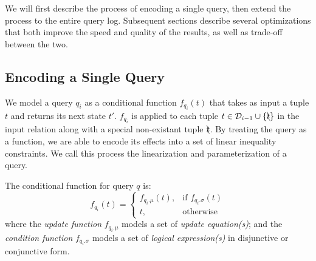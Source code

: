 We will first describe the process of encoding a single query,
then extend the process to the entire query log.
Subsequent sections describe several optimizations that  both
improve the speed and quality of the results, as well as trade-off between the two. 




\subsection{Encoding a Single Query}%
\label{sec:linearize}

We model a query $q_i$ as a conditional function $f_{q_i}(t)$ that takes as input a tuple $t$
and returns its next state $t'$.  $f_{q_i}$ is applied to each 
tuple $t \in \mathcal{D}_{i-1} \cup \{\bcancel{t}\}$ in the input relation along with a special
non-existant tuple $\bcancel{t}$. 
By treating the query as a function, we are able to encode its effects into a set
of linear inequality constraints.  We call this process the linearization and 
parameterization of a query.

\begin{definition} 
\label{def:cond}
	The conditional function for query $q$ is:
	\[
    f_{q_i}(t)= 
    \begin{cases}
    f_{q_i.\mu} (t) ,& \text{if } f_{q_i.\sigma} (t)\\
    t,              & \text{otherwise}
    \end{cases}
\]
where the \textit{update function} $f_{q_i.\mu}$ models a set of \textit{update equation(s)};
and the \textit{condition function} $f_{q_i.\sigma}$ models a set of \textit{logical expression(s)} in 
disjunctive or conjunctive form.
\end{definition} 



